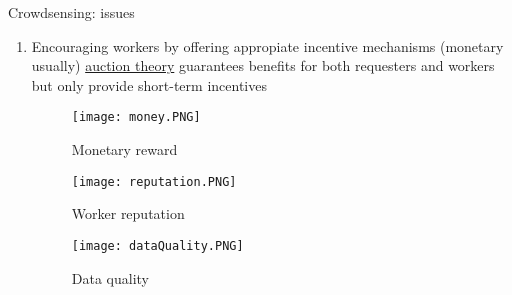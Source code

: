 \begin{frame}{Crowdsensing: issues}
\begin{multicols}{2}
  		\begin{enumerate}
    		\item Encouraging workers by offering appropiate \alert{incentive mechanisms} (monetary usually) \rightarrow  \underline{auction theory} guarantees benefits for both requesters and workers\cite{paper15} but only provide short-term incentives
                   \begin{figure}[H]
                    \centering
                      \centering
                      \texttt{[image: money.PNG]}
                      \caption{Monetary reward}
                      \centering
                      \texttt{[image: reputation.PNG]}
                      \caption{Worker reputation}
                        \centering
                        \texttt{[image: dataQuality.PNG]}
                        \caption{Data quality}
                    \end{figure}
  		\end{enumerate}
  \end{multicols}
\end{frame}

